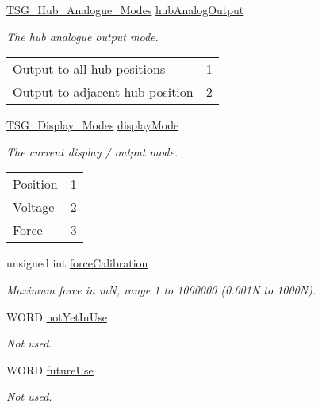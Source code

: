 \begin{DoxyCompactItemize}
\item 
\hyperlink{group___t_cube_strain_gauge_gad7e362e035ed669480ad23ba35b3a489}{T\+S\+G\+\_\+\+Hub\+\_\+\+Analogue\+\_\+\+Modes} \hyperlink{struct_t_s_g___i_o_settings_a36641cf65c931df8d597e34e173a4c7f}{hub\+Analog\+Output}
\begin{DoxyCompactList}\small\item\em The hub analogue output mode. \tabulinesep=1mm
\begin{longtabu} spread 0pt [c]{*2{|X[-1]}|}
\hline
Output to all hub positions&1 \\
Output to adjacent hub position&2 \\
\end{longtabu}
\end{DoxyCompactList}\item 
\hyperlink{group___t_cube_strain_gauge_ga73258438eff8b547e6f73771e6c9687f}{T\+S\+G\+\_\+\+Display\+\_\+\+Modes} \hyperlink{struct_t_s_g___i_o_settings_a0d1d781fdd4e2229e79f6e004342b656}{display\+Mode}
\begin{DoxyCompactList}\small\item\em The current display / output mode. \tabulinesep=1mm
\begin{longtabu} spread 0pt [c]{*2{|X[-1]}|}
\hline
Position&1 \\
Voltage&2 \\
Force&3 \\
\end{longtabu}
\end{DoxyCompactList}\item 
unsigned int \hyperlink{struct_t_s_g___i_o_settings_a820d5bfa06774a0b62a8a3f38e5968a4}{force\+Calibration}
\begin{DoxyCompactList}\small\item\em Maximum force in mN, range 1 to 1000000 (0.\+001N to 1000N). \end{DoxyCompactList}\item 
W\+O\+RD \hyperlink{struct_t_s_g___i_o_settings_a54c57426206aae2ef70798f43bc8ae27}{not\+Yet\+In\+Use}
\begin{DoxyCompactList}\small\item\em Not used. \end{DoxyCompactList}\item 
W\+O\+RD \hyperlink{struct_t_s_g___i_o_settings_aab7e1ce301fe70c6530128f0678df59b}{future\+Use}
\begin{DoxyCompactList}\small\item\em Not used. \end{DoxyCompactList}\end{DoxyCompactItemize}


